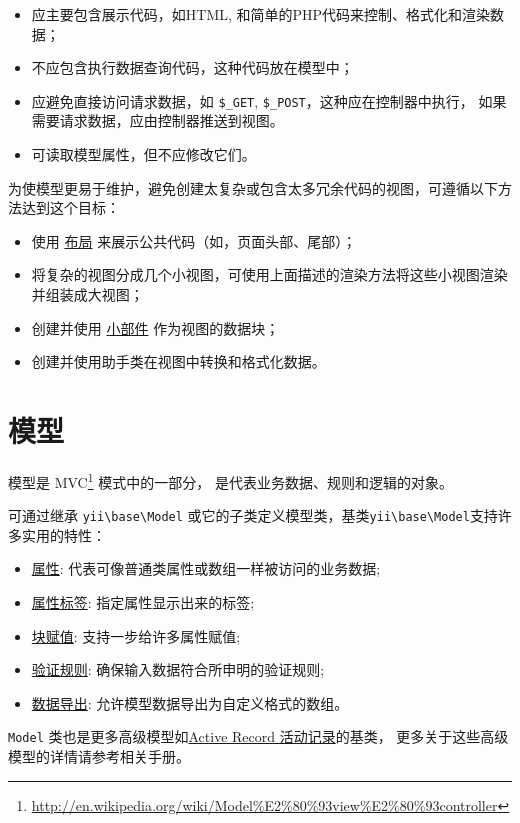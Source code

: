 \begin{itemize}
\item 应主要包含展示代码，如HTML, 和简单的PHP代码来控制、格式化和渲染数据；
\item 不应包含执行数据查询代码，这种代码放在模型中；
\item 应避免直接访问请求数据，如 \lstinline|$_GET|, \lstinline|$_POST|，这种应在控制器中执行，
如果需要请求数据，应由控制器推送到视图。
\item 可读取模型属性，但不应修改它们。
\end{itemize}
为使模型更易于维护，避免创建太复杂或包含太多冗余代码的视图，可遵循以下方法达到这个目标：

\begin{itemize}
\item 使用 \hyperref[structure-views.md::::layouts]{布局} 来展示公共代码（如，页面头部、尾部）；
\item 将复杂的视图分成几个小视图，可使用上面描述的渲染方法将这些小视图渲染并组装成大视图；
\item 创建并使用 \hyperref[structure-widgets.md]{小部件} 作为视图的数据块；
\item 创建并使用助手类在视图中转换和格式化数据。
\end{itemize}


\label{structure-models.md}\section{模型}
模型是 MVC\footnote{\url{http://en.wikipedia.org/wiki/Model\%E2\%80\%93view\%E2\%80\%93controller}} 模式中的一部分，
是代表业务数据、规则和逻辑的对象。

可通过继承 \texttt{yii{\allowbreak{}\textbackslash}base{\allowbreak{}\textbackslash}Model} 或它的子类定义模型类，基类\texttt{yii{\allowbreak{}\textbackslash}base{\allowbreak{}\textbackslash}Model}支持许多实用的特性：

\begin{itemize}
\item \hyperref[structure-models.md::::attributes]{属性}: 代表可像普通类属性或数组一样被访问的业务数据;
\item \hyperref[structure-models.md::::attribute-labels]{属性标签}: 指定属性显示出来的标签;
\item \hyperref[structure-models.md::::massive-assignment]{块赋值}: 支持一步给许多属性赋值;
\item \hyperref[structure-models.md::::validation-rules]{验证规则}: 确保输入数据符合所申明的验证规则;
\item \hyperref[structure-models.md::::data-exporting]{数据导出}: 允许模型数据导出为自定义格式的数组。
\end{itemize}
\lstinline|Model| 类也是更多高级模型如\hyperref[db-active-record.md]{Active Record 活动记录}的基类，
更多关于这些高级模型的详情请参考相关手册。

